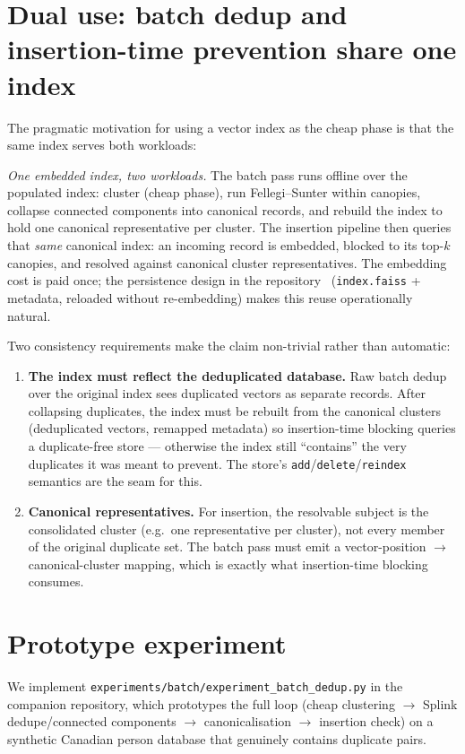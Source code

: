 \documentclass[11pt]{article}
\begin{document}
\section{Dual use: batch dedup and insertion-time prevention share one index}
\label{sec:dual}
The pragmatic motivation for using a vector index as the cheap phase is that the same index
serves both workloads:

\emph{One embedded index, two workloads.} The batch pass runs offline over the populated
index: cluster (cheap phase), run Fellegi--Sunter within canopies, collapse connected
components into canonical records, and rebuild the index to hold one canonical representative
per cluster. The insertion pipeline then queries that \emph{same} canonical index: an
incoming record is embedded, blocked to its top-$k$ canopies, and resolved against canonical
cluster representatives. The embedding cost is paid once; the persistence design in the
repository~\cite{pipeline} (\texttt{index.faiss} + metadata, reloaded without re-embedding)
makes this reuse operationally natural.

Two consistency requirements make the claim non-trivial rather than automatic:

\begin{enumerate}
  \item \textbf{The index must reflect the deduplicated database.} Raw batch dedup over the
        original index sees duplicated vectors as separate records. After collapsing
        duplicates, the index must be rebuilt from the canonical clusters (deduplicated
        vectors, remapped metadata) so insertion-time blocking queries a duplicate-free
        store --- otherwise the index still ``contains'' the very duplicates it was meant to
        prevent. The store's \texttt{add}/\texttt{delete}/\texttt{reindex} semantics are the
        seam for this.
  \item \textbf{Canonical representatives.} For insertion, the resolvable subject is the
        consolidated cluster (e.g.\ one representative per cluster), not every member of the
        original duplicate set. The batch pass must emit a vector-position $\to$ canonical-cluster
        mapping, which is exactly what insertion-time blocking consumes.
\end{enumerate}

\section{Prototype experiment}
\label{sec:emp}
We implement \texttt{experiments/batch/experiment\_batch\_dedup.py} in the companion repository, which
prototypes the full loop (cheap clustering $\to$ Splink dedupe/connected components $\to$
canonicalisation $\to$ insertion check) on a synthetic Canadian person database that
genuinely contains duplicate pairs.
\end{document}
